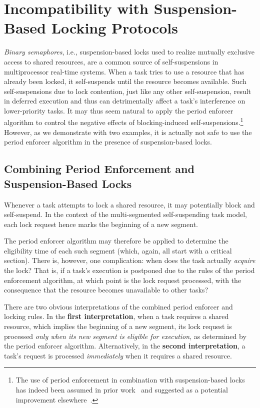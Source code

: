 \section{Incompatibility with Suspension-Based Locking Protocols}
\label{sec:locking}

\emph{Binary semaphores}, i.e., suspension-based locks used to realize mutually exclusive access to shared resources, are a common source of self-suspensions in multiprocessor real-time systems. When a task tries to use a resource that has already been locked, it self-suspends until the resource becomes available. Such self-suspensions due to lock contention, just like any other self-suspension, result in deferred execution and thus can detrimentally affect a task's interference on lower-priority tasks. It may thus seem natural to apply the period enforcer algorithm to control the negative effects of blocking-induced self-suspensions.\footnote{The use of  period enforcement in combination with suspension-based locks has indeed been assumed in prior work~\cite{Raj:91} and suggested as a potential improvement elsewhere~\cite{Lak:11,LNR:09}.} However, as we demonstrate with two examples, it is actually not safe to use the period enforcer algorithm in the presence of suspension-based locks.

\subsection{Combining Period Enforcement and Suspension-Based Locks}

Whenever a task attempts to lock a shared resource, it may potentially block and self-suspend. In the context of the multi-segmented self-suspending task model, each lock request hence marks the beginning of a new segment.

The period enforcer algorithm may therefore be applied to determine the eligibility time of each such segment (which, again, all start with a critical section). There is, however, one complication: when does the task actually \emph{acquire} the lock? That is, if a task's execution is postponed due to the rules of the period enforcement algorithm, at which point is the lock request processed, with the consequence that the resource becomes unavailable to other tasks? 

There are two obvious interpretations of the combined period enforcer and locking rules. In the \textbf{first interpretation}, when a task requires a shared resource, which implies the beginning of a new segment, its lock request is processed \emph{only when its new segment is eligible for execution}, as determined by the period enforcer algorithm. Alternatively, in the \textbf{second interpretation}, a task's request is processed \emph{immediately} when it requires a shared resource.

